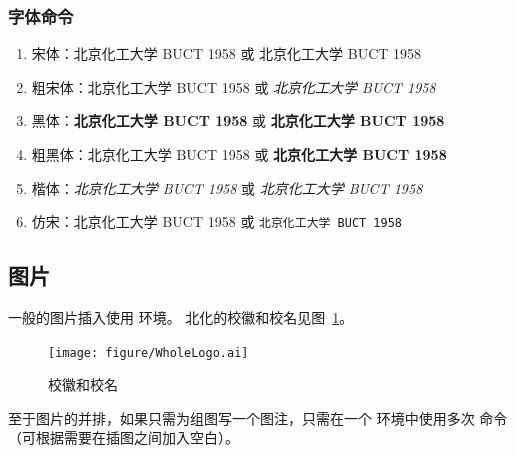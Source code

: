 \subsubsection{字体命令}
\begin{enumerate}
	\item 宋体：北京化工大学 BUCT 1958 或 \textrm{北京化工大学 BUCT 1958}
	\item 粗宋体：{\bfsong 北京化工大学 BUCT 1958} 或 \emph{北京化工大学 BUCT 1958}
	\item 黑体：{\bfseries 北京化工大学 BUCT 1958} 或 \textbf{北京化工大学 BUCT 1958}
	\item 粗黑体：{\bfhei 北京化工大学 BUCT 1958} 或 \textbf{\heiti 北京化工大学 BUCT 1958}
	\item 楷体：{\itshape 北京化工大学 BUCT 1958} 或 \textit{北京化工大学 BUCT 1958}
	\item 仿宋：{\ttfamily 北京化工大学 BUCT 1958} 或 \texttt{北京化工大学 BUCT 1958}
\end{enumerate}
\subsection{图片}\label{subsec:fig}
一般的图片插入使用  环境。
北化的校徽和校名见图~\ref{fig:WholeLogo}。

\begin{figure}[H]
	\centering
	\texttt{[image: figure/WholeLogo.ai]}
	\caption{校徽和校名}\label{fig:WholeLogo}
\end{figure}

至于图片的并排，如果只需为组图写一个图注，只需在一个  环境中使用多次  命令（可根据需要在插图之间加入空白）。

